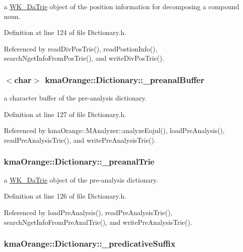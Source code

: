 a \hyperlink{classkmaOrange_1_1WK__DaTrie}{WK\_\-DaTrie} object of the position information for decomposing a compound noun. 



Definition at line 124 of file Dictionary.h.

Referenced by readDivPosTrie(), readPostionInfo(), searchNgetInfoFromPosTrie(), and writeDivPosTrie().\hypertarget{classkmaOrange_1_1Dictionary_ed6bcde127ce4b739ab810bdd939ffca}{
\subsubsection[{\_\-preanalBuffer}]{$<$char$>$ {\bf kmaOrange::Dictionary::\_\-preanalBuffer}}}
\label{classkmaOrange_1_1Dictionary_ed6bcde127ce4b739ab810bdd939ffca}


a character buffer of the pre-analysis dictionary. 



Definition at line 127 of file Dictionary.h.

Referenced by kmaOrange::MAnalyzer::analyzeEojul(), loadPreAnalysis(), readPreAnalysisTrie(), and writePreAnalysisTrie().\hypertarget{classkmaOrange_1_1Dictionary_686251e5b7eb7e91319d39f166806091}{
\subsubsection[{\_\-preanalTrie}]{ {\bf kmaOrange::Dictionary::\_\-preanalTrie}}}
\label{classkmaOrange_1_1Dictionary_686251e5b7eb7e91319d39f166806091}


a \hyperlink{classkmaOrange_1_1WK__DaTrie}{WK\_\-DaTrie} object of the pre-analysis dictionary. 



Definition at line 126 of file Dictionary.h.

Referenced by loadPreAnalysis(), readPreAnalysisTrie(), searchNgetInfoFromPreAnalTrie(), and writePreAnalysisTrie().\hypertarget{classkmaOrange_1_1Dictionary_4644d581233713893af48a2536737170}{
\subsubsection[{\_\-predicativeSuffix}]{ {\bf kmaOrange::Dictionary::\_\-predicativeSuffix}}}
\label{classkmaOrange_1_1Dictionary_4644d581233713893af48a2536737170}




